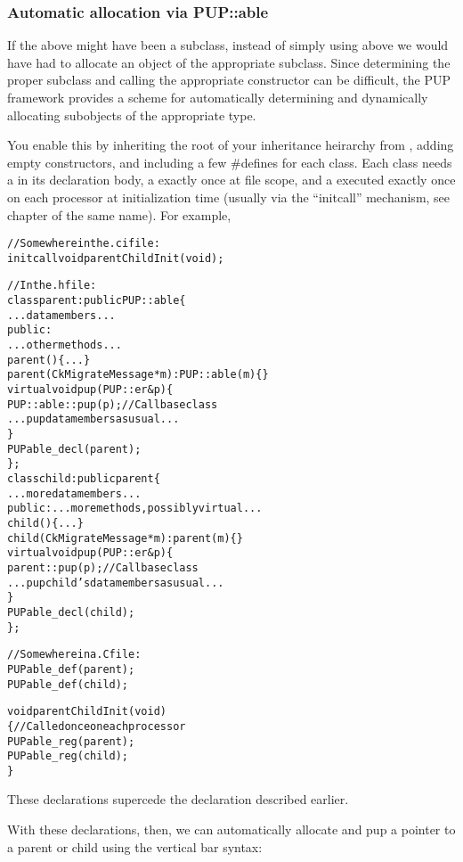 \subsubsection{Automatic allocation via PUP::able}
If the  above might have been a subclass, instead of
simply using  above we would have had to allocate 
an object of the appropriate subclass.  Since determining the
proper subclass and calling the appropriate constructor can be 
difficult, the PUP framework provides a scheme for automatically
determining and dynamically allocating subobjects of the appropriate type.

You enable this by inheriting the root of your inheritance heirarchy 
from , adding empty  constructors,
and including a few \#defines for each class.
Each class needs a  in its 
declaration body, a  exactly once
at file scope, and a  executed
exactly once on each processor at initialization time (usually
via the ``initcall'' mechanism, see chapter of the same name).
For example,

\begin{alltt}
//Somewhere in the .ci file:
   initcall void parentChildInit(void);

//In the .h file:
class parent : public PUP::able \{
    ... data members ...
public:
    ... other methods ...
    parent() \{...\}
    parent(CkMigrateMessage *m) : PUP::able(m) \{\}
    virtual void pup(PUP::er &p) \{
        PUP::able::pup(p);//Call base class
        ... pup data members as usual ...
    \}
    PUPable\_decl(parent);    
\};
class child : public parent \{
    ... more data members ...
public:    ... more methods, possibly virtual ...
    child() \{...\}
    child(CkMigrateMessage *m) : parent(m) \{\}
    virtual void pup(PUP::er &p) \{
        parent::pup(p);//Call base class
        ... pup child's data members as usual ...
    \}
    PUPable\_decl(child);    
\};

//Somewhere in a .C file:
PUPable\_def(parent);
PUPable\_def(child);

void parentChildInit(void)
\{//Called once on each processor
    PUPable\_reg(parent);
    PUPable\_reg(child);
\}
\end{alltt}

These declarations supercede the  declaration 
described earlier.

With these declarations, then, we can automatically 
allocate and pup a pointer to a parent or child
using the vertical bar  syntax:

